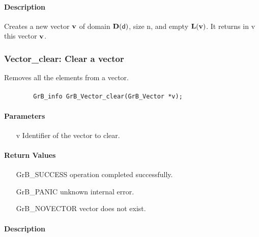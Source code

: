 \paragraph{Description}

Creates a new vector ${\bf v}$ of domain $\bold{D}({\sf d})$, size {\sf n}, and
empty $\bold{L}({\bf v})$. It returns in {\sf v} this vector ${\bf v}$.

\subsubsection{{\sf Vector\_clear}: Clear a vector}

Removes all the elements from a vector.

\paragraph{\syntax}

\begin{verbatim}
        GrB_info GrB_Vector_clear(GrB_Vector *v);
\end{verbatim}

\paragraph{Parameters}

\begin{itemize}[leftmargin=1.1in]
    \item[{\sf v}] Identifier of the vector to clear.
\end{itemize}

\paragraph{Return Values}

\begin{itemize}[leftmargin=2.1in]
\item[{\sf GrB\_SUCCESS}]   operation completed successfully.
\item[{\sf GrB\_PANIC}]     unknown internal error.
\item[{\sf GrB\_NOVECTOR}]  vector does not exist.
\end{itemize}

\paragraph{Description}


